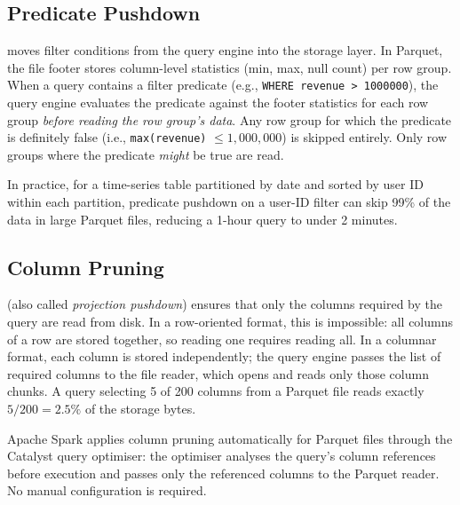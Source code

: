 \subsection{Predicate Pushdown}
\label{subsec:pred-pushdown}

 moves filter conditions from the query engine
into the storage layer. In Parquet, the file footer stores column-level
statistics (min, max, null count) per row group. When a query contains
a filter predicate (e.g., \texttt{WHERE revenue > 1000000}), the query
engine evaluates the predicate against the footer statistics for each
row group \emph{before reading the row group's data}. Any row group for
which the predicate is definitely false (i.e., \texttt{max(revenue)}
$\leq 1{,}000{,}000$) is skipped entirely. Only row groups where the
predicate \emph{might} be true are read.

In practice, for a time-series table partitioned by date and sorted by
user ID within each partition, predicate pushdown on a user-ID filter
can skip 99\% of the data in large Parquet files, reducing a 1-hour
query to under 2 minutes.

\subsection{Column Pruning}
\label{subsec:col-pruning}

 (also called \emph{projection pushdown}) ensures
that only the columns required by the query are read from disk. In a
row-oriented format, this is impossible: all columns of a row are stored
together, so reading one requires reading all. In a columnar format, each
column is stored independently; the query engine passes the list of
required columns to the file reader, which opens and reads only those
column chunks. A query selecting 5 of 200 columns from a Parquet file
reads exactly $5/200 = 2.5\%$ of the storage bytes.

Apache Spark applies column pruning automatically for Parquet files
through the Catalyst query optimiser: the optimiser analyses the query's
column references before execution and passes only the referenced
columns to the Parquet reader. No manual configuration is required.

